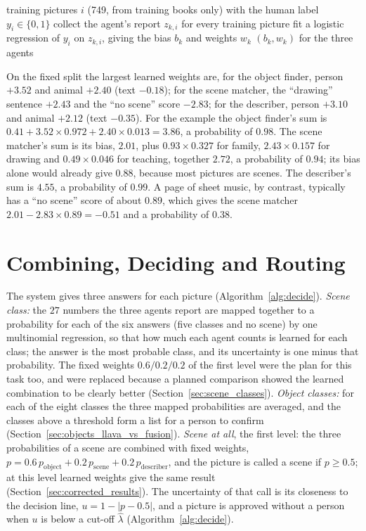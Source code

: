 \begin{algorithm}[!htbp]
\caption{Learning the mappings}
\label{alg:translation}
\begin{algorithmic}[1]
\Require training pictures $i$ (749, from training books only) with the human label $y_i \in \{0,1\}$
  \State collect the agent's report $z_{k,i}$ for every training picture
  \State fit a logistic regression of $y_i$ on $z_{k,i}$, giving the bias $b_k$ and weights $w_k$
\EndFor
\State \Return $(b_k, w_k)$ for the three agents
\end{algorithmic}
\end{algorithm}

On the fixed split the largest learned weights are, for the object finder, person $+3.52$ and animal $+2.40$ (text $-0.18$); for the scene matcher, the ``drawing'' sentence $+2.43$ and the ``no scene'' score $-2.83$; for the describer, person $+3.10$ and animal $+2.12$ (text $-0.35$). For the example the object finder's sum is $0.41 + 3.52 \times 0.972 + 2.40 \times 0.013 = 3.86$, a probability of $0.98$. The scene matcher's sum is its bias, $2.01$, plus $0.93 \times 0.327$ for family, $2.43 \times 0.157$ for drawing and $0.49 \times 0.046$ for teaching, together $2.72$, a probability of $0.94$; its bias alone would already give $0.88$, because most pictures are scenes. The describer's sum is $4.55$, a probability of $0.99$. A page of sheet music, by contrast, typically has a ``no scene'' score of about $0.89$, which gives the scene matcher $2.01 - 2.83 \times 0.89 = -0.51$ and a probability of $0.38$.

\section{Combining, Deciding and Routing}
\label{sec:corrected_decision}

The system gives three answers for each picture (Algorithm~\ref{alg:decide}). \emph{Scene class:} the $27$ numbers the three agents report are mapped together to a probability for each of the six answers (five classes and no scene) by one multinomial regression, so that how much each agent counts is learned for each class; the answer is the most probable class, and its uncertainty is one minus that probability. The fixed weights $0.6/0.2/0.2$ of the first level were the plan for this task too, and were replaced because a planned comparison showed the learned combination to be clearly better (Section~\ref{sec:scene_classes}). \emph{Object classes:} for each of the eight classes the three mapped probabilities are averaged, and the classes above a threshold form a list for a person to confirm (Section~\ref{sec:objects_llava_vs_fusion}). \emph{Scene at all}, the first level: the three probabilities of a scene are combined with fixed weights, $p = 0.6\,p_{\text{object}} + 0.2\,p_{\text{scene}} + 0.2\,p_{\text{describer}}$, and the picture is called a scene if $p \ge 0.5$; at this level learned weights give the same result (Section~\ref{sec:corrected_results}). The uncertainty of that call is its closeness to the decision line, $u = 1 - |p - 0.5|$, and a picture is approved without a person when $u$ is below a cut-off $\hat\lambda$ (Algorithm~\ref{alg:decide}).

